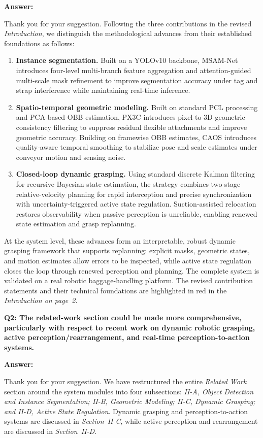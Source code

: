 \documentclass[journal,10pt]{IEEEtran}
\newcommand{\question}[2]{%
  \par\smallskip\noindent
  {\color{responseblue}\bfseries\clubpenalty=10000\widowpenalty=10000 Q#1: #2\par}%
  \par\nobreak\noindent
}
\newcommand{\answer}{%
  \par\smallskip\noindent
  \textbf{Answer: }\ignorespaces
}
\begin{document}
\answer
Thank you for your suggestion. Following the three contributions in the revised \textit{Introduction}, we distinguish the methodological advances from their established foundations as follows:
\begin{enumerate}
\renewcommand{\labelenumi}{\arabic{enumi}.}
\item \textbf{Instance segmentation.} Built on a YOLOv10 backbone, MSAM-Net introduces four-level multi-branch feature aggregation and attention-guided multi-scale mask refinement to improve segmentation accuracy under tag and strap interference while maintaining real-time inference.
\item \textbf{Spatio-temporal geometric modeling.} Built on standard PCL processing and PCA-based OBB estimation, PX3C introduces pixel-to-3D geometric consistency filtering to suppress residual flexible attachments and improve geometric accuracy. Building on framewise OBB estimates, CAOS introduces quality-aware temporal smoothing to stabilize pose and scale estimates under conveyor motion and sensing noise.
\item \textbf{Closed-loop dynamic grasping.} Using standard discrete Kalman filtering for recursive Bayesian state estimation, the strategy combines two-stage relative-velocity planning for rapid interception and precise synchronization with uncertainty-triggered active state regulation. Suction-assisted relocation restores observability when passive perception is unreliable, enabling renewed state estimation and grasp replanning.
\end{enumerate}
At the system level, these advances form an interpretable, robust dynamic grasping framework that supports replanning: explicit masks, geometric states, and motion estimates allow errors to be inspected, while active state regulation closes the loop through renewed perception and planning. The complete system is validated on a real robotic baggage-handling platform. The revised contribution statements and their technical foundations are highlighted in red in the \textit{Introduction on page~2}.

\question{2}{The related-work section could be made more comprehensive, particularly with respect to recent work on dynamic robotic grasping, active perception/rearrangement, and real-time perception-to-action systems.}

\answer
Thank you for your suggestion. We have restructured the entire \textit{Related Work} section around the system modules into four subsections: \textit{II-A, Object Detection and Instance Segmentation; II-B, Geometric Modeling; II-C, Dynamic Grasping; and II-D, Active State Regulation}. Dynamic grasping and perception-to-action systems are discussed in \textit{Section~II-C}, while active perception and rearrangement are discussed in \textit{Section~II-D}.
\end{document}
